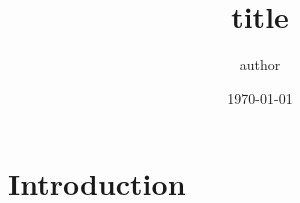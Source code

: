 \documentclass{article}
\title{{{title}}}
\author{{{author}}}
\date{\today}
\begin{document}
\maketitle

\section*{Introduction}
\end{document}
